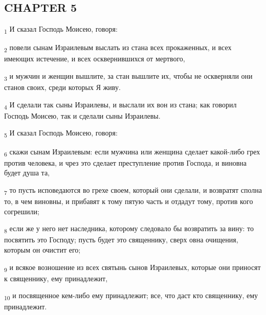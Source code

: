 \subsection{CHAPTER 5}
\begin{tcolorbox}
\textsubscript{1} И сказал Господь Моисею, говоря:
\end{tcolorbox}
\begin{tcolorbox}
\textsubscript{2} повели сынам Израилевым выслать из стана всех прокаженных, и всех имеющих истечение, и всех осквернившихся от мертвого,
\end{tcolorbox}
\begin{tcolorbox}
\textsubscript{3} и мужчин и женщин вышлите, за стан вышлите их, чтобы не оскверняли они станов своих, среди которых Я живу.
\end{tcolorbox}
\begin{tcolorbox}
\textsubscript{4} И сделали так сыны Израилевы, и выслали их вон из стана; как говорил Господь Моисею, так и сделали сыны Израилевы.
\end{tcolorbox}
\begin{tcolorbox}
\textsubscript{5} И сказал Господь Моисею, говоря:
\end{tcolorbox}
\begin{tcolorbox}
\textsubscript{6} скажи сынам Израилевым: если мужчина или женщина сделает какой-либо грех против человека, и чрез это сделает преступление против Господа, и виновна будет душа та,
\end{tcolorbox}
\begin{tcolorbox}
\textsubscript{7} то пусть исповедаются во грехе своем, который они сделали, и возвратят сполна то, в чем виновны, и прибавят к тому пятую часть и отдадут тому, против кого согрешили;
\end{tcolorbox}
\begin{tcolorbox}
\textsubscript{8} если же у него нет наследника, которому следовало бы возвратить за вину: то посвятить это Господу; пусть будет это священнику, сверх овна очищения, которым он очистит его;
\end{tcolorbox}
\begin{tcolorbox}
\textsubscript{9} и всякое возношение из всех святынь сынов Израилевых, которые они приносят к священнику, ему принадлежит,
\end{tcolorbox}
\begin{tcolorbox}
\textsubscript{10} и посвященное кем-либо ему принадлежит; все, что даст кто священнику, ему принадлежит.
\end{tcolorbox}

